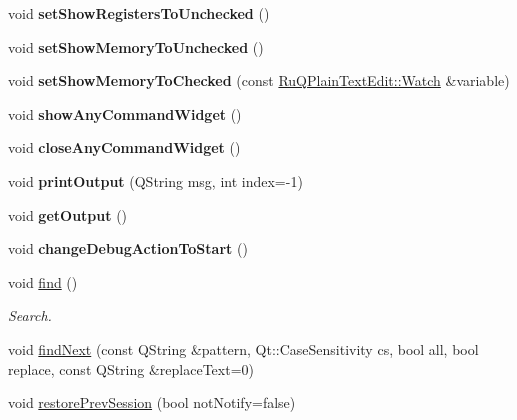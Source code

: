 \begin{DoxyCompactItemize}
\item 
\hypertarget{class_main_window_aa8e175e826ca88ed0edc86c4f58b2b3c}{}void {\bfseries set\+Show\+Registers\+To\+Unchecked} ()\label{class_main_window_aa8e175e826ca88ed0edc86c4f58b2b3c}

\item 
\hypertarget{class_main_window_aab119cfa893d26727179f37f4d93b9c3}{}void {\bfseries set\+Show\+Memory\+To\+Unchecked} ()\label{class_main_window_aab119cfa893d26727179f37f4d93b9c3}

\item 
\hypertarget{class_main_window_a94de085952cb2e1c2cabdf0589589bf7}{}void {\bfseries set\+Show\+Memory\+To\+Checked} (const \hyperlink{struct_ru_q_plain_text_edit_1_1_watch}{Ru\+Q\+Plain\+Text\+Edit\+::\+Watch} \&variable)\label{class_main_window_a94de085952cb2e1c2cabdf0589589bf7}

\item 
\hypertarget{class_main_window_a8208aa1ac575ce525eeb67962de39649}{}void {\bfseries show\+Any\+Command\+Widget} ()\label{class_main_window_a8208aa1ac575ce525eeb67962de39649}

\item 
\hypertarget{class_main_window_a4b549dce3792ad8e98c579b114dbf2d6}{}void {\bfseries close\+Any\+Command\+Widget} ()\label{class_main_window_a4b549dce3792ad8e98c579b114dbf2d6}

\item 
\hypertarget{class_main_window_a69a5788187930b71d8847316ea1ff400}{}void {\bfseries print\+Output} (Q\+String msg, int index=-\/1)\label{class_main_window_a69a5788187930b71d8847316ea1ff400}

\item 
\hypertarget{class_main_window_a7132389264d1fc06daf0f592ec390b63}{}void {\bfseries get\+Output} ()\label{class_main_window_a7132389264d1fc06daf0f592ec390b63}

\item 
\hypertarget{class_main_window_ac19a5fb34a804da9e7f970917843a680}{}void {\bfseries change\+Debug\+Action\+To\+Start} ()\label{class_main_window_ac19a5fb34a804da9e7f970917843a680}

\item 
\hypertarget{class_main_window_a069e1f54d0a804ca17cb8d4d78f093b0}{}void \hyperlink{class_main_window_a069e1f54d0a804ca17cb8d4d78f093b0}{find} ()\label{class_main_window_a069e1f54d0a804ca17cb8d4d78f093b0}

\begin{DoxyCompactList}\small\item\em Search. \end{DoxyCompactList}\item 
void \hyperlink{class_main_window_a56e46fe3769163f479d2a2b5eeb00b24}{find\+Next} (const Q\+String \&pattern, Qt\+::\+Case\+Sensitivity cs, bool all, bool replace, const Q\+String \&replace\+Text=0)
\item 
\hypertarget{class_main_window_a31b9332bdc8d48261497648c3faf2f91}{}void \hyperlink{class_main_window_a31b9332bdc8d48261497648c3faf2f91}{restore\+Prev\+Session} (bool not\+Notify=false)\label{class_main_window_a31b9332bdc8d48261497648c3faf2f91}


\end{DoxyCompactItemize}
